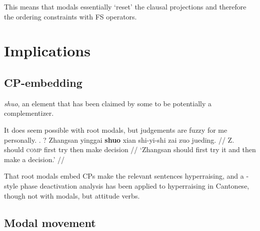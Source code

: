 \documentclass[11pt]{article}
\newcommand{\opfs}{\textit{Op}\(_{\mathrm{FS}}\)}
\newcommand{\topobj}{Topic\(_{\mathrm{obj}}\)P}
\begin{document}
This means that modals essentially `reset' the clausal projections and therefore the ordering constraints with FS operators.

%
%
%
%
%
%
%





\section{Implications}
\label{sec:implications}

\subsection{CP-embedding}
\label{sub:cp_embedding}


\emph{shuo}, an element that has been claimed by some \citep{chappellVariationGrammaticalizationComplementizers2008,huang2003doubts,huangControlComplementsMandarin2018a} to be potentially a complementizer.

It does seem possible with root modals, but judgements are fuzzy for me personally.
\ex. ?\begingl
  \gla Zhangsan yinggai \textbf{shuo} xian shi-yi-shi zai zuo jueding. //
  \glb Z. should \textsc{comp} first try then make decision //
  \glft `Zhangsan should first try it and then make a decision.' //
\endgl

That root modals embed CPs make the relevant sentences hyperraising, and a \citet{leeHyperraisingEvidentialityPhase2024}-style phase deactivation analysis has been applied to hyperraising in Cantonese, though not with modals, but attitude verbs.

\subsection{Modal movement}
\label{sub:modal_movement}
\end{document}
